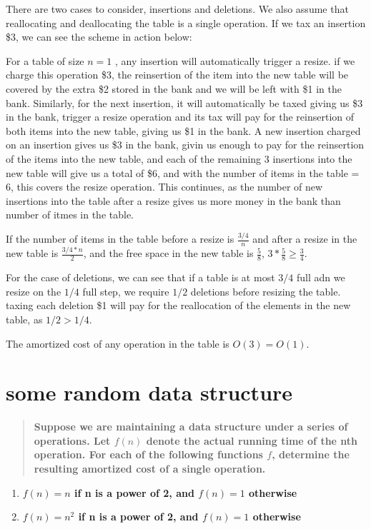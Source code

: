 \documentclass[titlepage]{article}\usepackage[]{graphicx}\usepackage[]{color}
\begin{document}
There are two cases to consider, insertions and deletions. We also assume that
reallocating and deallocating the table is a single operation. If we tax an
insertion \$3, we can see the scheme in action below:

For a table of size $n=1$ , any insertion will automatically trigger a resize.
if we charge this operation \$3, the reinsertion of the item into the new table
will be covered by the extra \$2 stored in the bank and we will be left with 
\$1 in the bank. Similarly, for the next insertion, it will automatically
be taxed giving us \$3 in the bank, trigger a resize operation and its tax will
pay for the reinsertion of both items into the new table, giving us \$1 in the
bank. A new insertion charged on an insertion gives us \$3 in the bank, givin
us enough to pay for the reinsertion of the items into the new table, and each
of the remaining 3 insertions into the new table will give us a total of \$6,
and with the number of items in the table = 6, this covers the resize
operation. This continues, as the number of new insertions into the table after
a resize gives us more money in the bank than number of itmes in the table. 

If the number of items in the table before a resize is $\frac{3/4}n$ and after a resize
in the new table is $\frac{3/4 *n}{2}$, and the free space in the new table is
$\frac{5}{8} $, $3 * \frac{5}{8} \geq \frac{3}{4}$. 

For the case of deletions, we can see that if a table is at most $3/4$ full adn
we resize on the $1/4$ full step, we require $1/2$ deletions before resizing
the table. taxing each deletion \$1 will pay for the reallocation of the
elements in the new table, as $1/2 > 1/4$. 

The amortized cost of any operation in the table is $O(3) = O(1)$.  


\section{some random data structure}
\begin{quote}
  \textbf{Suppose we are maintaining a data structure under a series of
  operations. Let $f(n)$ denote the actual running time of the nth operation.
For each of the following functions $f$, determine the resulting amortized cost
of a single operation.}
\end{quote}

\begin{enumerate}
  \item \textbf{ $f(n) = n$ if n is a power of 2, and $f(n) = 1$ otherwise}
  \item \textbf{ $f(n) = n^2$ if n is a power of 2, and $f(n) = 1$ otherwise}
\end{enumerate}
\end{document}
